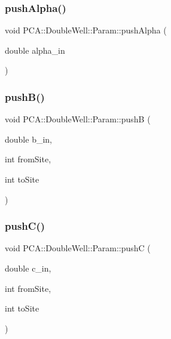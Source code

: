 \hypertarget{class_p_c_a_1_1_double_well_1_1_param_a33d960f14ffb71535e3bb9fada7aa4fa}{}\label{class_p_c_a_1_1_double_well_1_1_param_a33d960f14ffb71535e3bb9fada7aa4fa} 
\subsubsection{\texorpdfstring{push\+Alpha()}{pushAlpha()}}
{\footnotesize\ttfamily void P\+C\+A\+::\+Double\+Well\+::\+Param\+::push\+Alpha (\begin{DoxyParamCaption}\item[{double}]{alpha\+\_\+in }\end{DoxyParamCaption})}

\hypertarget{class_p_c_a_1_1_double_well_1_1_param_a23baa2d632f7ea0e3327ea8e106f551f}{}\label{class_p_c_a_1_1_double_well_1_1_param_a23baa2d632f7ea0e3327ea8e106f551f} 
\subsubsection{\texorpdfstring{push\+B()}{pushB()}}
{\footnotesize\ttfamily void P\+C\+A\+::\+Double\+Well\+::\+Param\+::pushB (\begin{DoxyParamCaption}\item[{double}]{b\+\_\+in,  }\item[{int}]{from\+Site,  }\item[{int}]{to\+Site }\end{DoxyParamCaption})}

\hypertarget{class_p_c_a_1_1_double_well_1_1_param_aedf09fe351143731e707c39beea02cff}{}\label{class_p_c_a_1_1_double_well_1_1_param_aedf09fe351143731e707c39beea02cff} 
\subsubsection{\texorpdfstring{push\+C()}{pushC()}}
{\footnotesize\ttfamily void P\+C\+A\+::\+Double\+Well\+::\+Param\+::pushC (\begin{DoxyParamCaption}\item[{double}]{c\+\_\+in,  }\item[{int}]{from\+Site,  }\item[{int}]{to\+Site }\end{DoxyParamCaption})}

